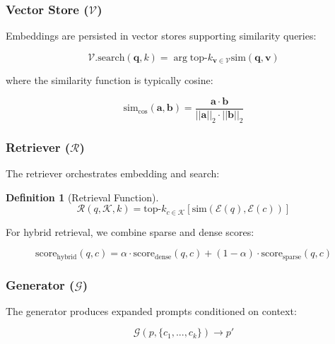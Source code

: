 \documentclass[11pt,a4paper]{article}
\newtheorem{definition}{Definition}
\newcommand{\corpus}{\mathcal{K}}
\newcommand{\simfunc}{\text{sim}}
\begin{document}
\subsubsection{Vector Store ($\mathcal{V}$)}

Embeddings are persisted in vector stores supporting similarity queries:

\begin{equation}
\mathcal{V}.\text{search}(\mathbf{q}, k) = \arg\text{top-}k_{\mathbf{v} \in \mathcal{V}} \simfunc(\mathbf{q}, \mathbf{v})
\end{equation}

where the similarity function is typically cosine:

\begin{equation}
\simfunc_{\cos}(\mathbf{a}, \mathbf{b}) = \frac{\mathbf{a} \cdot \mathbf{b}}{||\mathbf{a}||_2 \cdot ||\mathbf{b}||_2}
\end{equation}

\subsubsection{Retriever ($\mathcal{R}$)}

The retriever orchestrates embedding and search:

\begin{definition}[Retrieval Function]
\begin{equation}
\mathcal{R}(q, \corpus, k) = \text{top-}k_{c \in \corpus}\left[\simfunc(\mathcal{E}(q), \mathcal{E}(c))\right]
\end{equation}
\end{definition}

For hybrid retrieval, we combine sparse and dense scores:

\begin{equation}
\text{score}_{\text{hybrid}}(q, c) = \alpha \cdot \text{score}_{\text{dense}}(q, c) + (1-\alpha) \cdot \text{score}_{\text{sparse}}(q, c)
\end{equation}

\subsubsection{Generator ($\mathcal{G}$)}

The generator produces expanded prompts conditioned on context:

\begin{equation}
\mathcal{G}(p, \{c_1, ..., c_k\}) \rightarrow p'
\end{equation}
\end{document}
